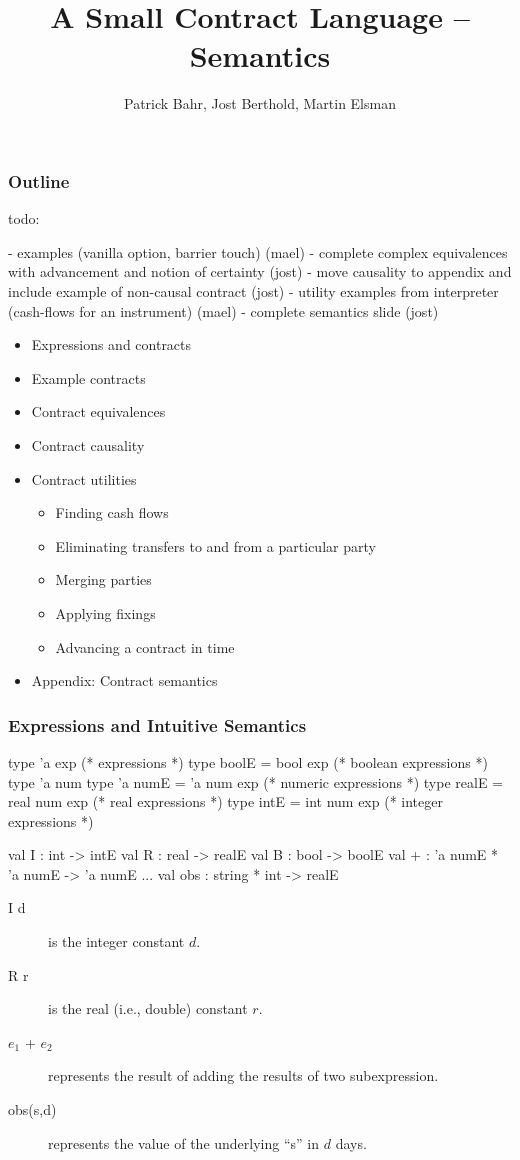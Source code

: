\documentclass[xcolor=dvipsnames,11pt]{beamer}
\title{A Small Contract Language -- Semantics}
\author[Bahr,Berthold,Elsman]{Patrick Bahr, Jost Berthold, Martin Elsman}
\begin{document}
\frame[plain]{\titlepage}

\begin{frame}[fragile,t]
    \frametitle{Outline}

todo:

 - examples (vanilla option, barrier touch)                                     (mael)
 - complete complex equivalences with advancement and notion of certainty       (jost)
 - move causality to appendix and include example of non-causal contract        (jost)
 - utility examples from interpreter (cash-flows for an instrument)             (mael)
 - complete semantics slide                                                     (jost)

\begin{itemize}
\item Expressions and contracts
\item Example contracts
\item Contract equivalences
\item Contract causality
\item Contract utilities
 \begin{itemize}
  \item Finding cash flows
  \item Eliminating transfers to and from a particular party
  \item Merging parties
  \item Applying fixings
  \item Advancing a contract in time
  \end{itemize}
\item Appendix: Contract semantics
\end{itemize}
\end{frame}


\begin{frame}[fragile,t]
    \frametitle{Expressions and Intuitive Semantics}

\begin{mlcode}
  type 'a exp                     (* expressions *)
  type boolE = bool exp           (* boolean expressions *)
  type 'a num 
  type 'a numE = 'a num exp       (* numeric expressions *)
  type realE = real num exp       (*  real expressions *)
  type intE = int num exp         (*  integer expressions *)
 
  val I   : int -> intE
  val R   : real -> realE
  val B   : bool -> boolE
  val +   : 'a numE * 'a numE -> 'a numE
  ...
  val obs : string * int -> realE
\end{mlcode}

\begin{description}
\item[I d] is the integer constant $d$.
\item[R r] is the real (i.e., double) constant $r$.
\item[$e_1$ + $e_2$] represents the result of adding the results of two subexpression.
\item[obs(s,d)] represents the value of the underlying ``s'' in $d$ days.
\end{description}

\end{frame}
\end{document}
